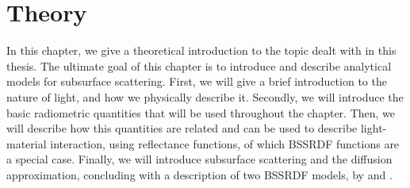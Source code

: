 \chapter{Theory}
\label{chap:theory}

In this chapter, we give a theoretical introduction to the topic dealt with in this thesis. The ultimate goal of this chapter is to introduce and describe analytical models for subsurface scattering. First, we will give a brief introduction to the nature of light, and how we physically describe it. Secondly, we will introduce the basic radiometric quantities that will be used throughout the chapter. Then, we will describe how this quantities are related and can be used to describe light-material interaction, using reflectance functions, of which BSSRDF functions are a special case. Finally, we will introduce subsurface scattering and the diffusion approximation, concluding with a description of two BSSRDF models, by \cite{Jensen:2001:PMS:383259.383319} and \cite{IMM2013-06646}.


